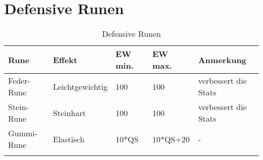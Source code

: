 \section{Defensive Runen}
\begin{longtable}{|l|l|l|l|l|}
\hline
\textbf{Rune} & \textbf{Effekt} & \textbf{EW min.} & \textbf{EW max.} & \textbf{Anmerkung} \\

\hline
Feder-Rune & Leichtgewichtig & 100 & 100 & verbessert die Stats \\ 
\hline
Stein-Rune & Steinhart & 100 & 100 & verbessert die Stats \\ 
\hline
Gummi-Rune & Elastisch & 10*QS & 10*QS+20 & - \\ 
\hline

\caption{Defensive Runen}
\label{tab:DefensiveRunen}
\end{longtable}